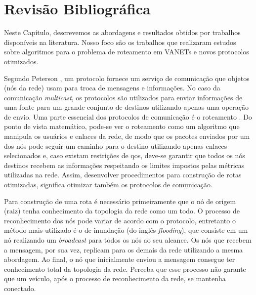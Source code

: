 \chapter{Revisão Bibliográfica} \label{chp:trab-relacionados}

Neste  Capítulo, descrevemos  as abordagens  e resultados  obtidos por
trabalhos disponíveis na literatura.  Nosso  foco são os trabalhos que
realizaram estudos sobre  algoritmos para o problema  de roteamento em
VANETs e novos protocolos otimizados.

Segundo Peterson \cite{Peterson:2011}, um protocolo fornece um serviço
de comunicação que objetos (nós da  rede) usam para troca de mensagens
e informações.  No caso da  comunicação {\em multicast}, os protocolos
são utilizados  para enviar  informações de uma  fonte para  um grande
conjunto de  destinos utilizando  apenas uma  operação de  envio.  Uma
parte  essencial   dos  protocolos  de  comunicação   é  o  roteamento
\cite{OLIVEIRA20051953}. Do  ponto de vista matemático,  pode-se ver o
roteamento como  um algoritmo  que manipula os  usuários e  enlaces da
rede, de modo  que os pacotes enviados  por um dos nós  pode seguir um
caminho para o destino utilizando  apenas enlaces selecionados e, caso
existam restrições  de \gls{qos},  deve-se garantir  que todos  os nós
destinos recebem as informações  respeitando os limites impostos pelas
métricas  utilizadas na  rede. Assim,  desenvolver procedimentos  para
construção  de   rotas  otimizadas,   significa  otimizar   também  os
protocolos de comunicação.

Para construção  de uma rota  é necessário  primeiramente que o  nó de
origem (raiz) tenha conhecimento da topologia da rede como um todo.  O
processo  de  reconhecimento dos  nós  pode  variar  de acordo  com  o
protocolo, entretanto  o método  mais utilizado é  o de  inundação (do
inglês  \textit{flooding}),  que  consiste  em  um  nó  realizando  um
\textit{broadcast}  para todos  os nós  ao  seu alcance.   Os nós  que
recebem  a mensagem,  por sua  vez, replicam  para os  demais da  rede
utilizando a mesma abordagem. Ao final, o nó que inicialmente enviou a
mensagem consegue ter conhecimento total da topologia da rede. Perceba
que  esse processo  não garante  que um  veículo, após  o processo  de
reconhecimento da rede, se mantenha conectado.

